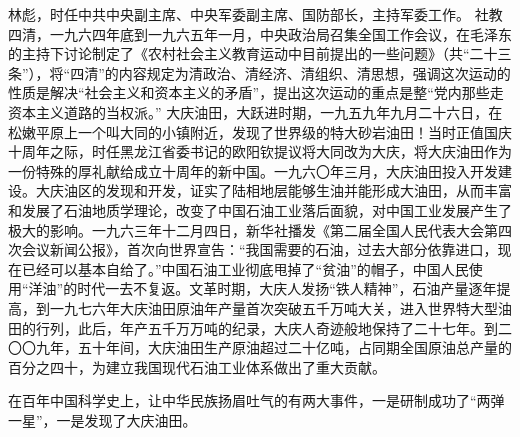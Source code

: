 \begin{maonote}
林彪，时任中共中央副主席、中央军委副主席、国防部长，主持军委工作。
社教四清，一九六四年底到一九六五年一月，中央政治局召集全国工作会议，在毛泽东的主持下讨论制定了《农村社会主义教育运动中目前提出的一些问题》（共“二十三条”），将“四清”的内容规定为清政治、清经济、清组织、清思想，强调这次运动的性质是解决“社会主义和资本主义的矛盾”，提出这次运动的重点是整“党内那些走资本主义道路的当权派。”
大庆油田，大跃进时期，一九五九年九月二十六日，在松嫩平原上一个叫大同的小镇附近，发现了世界级的特大砂岩油田！当时正值国庆十周年之际，时任黑龙江省委书记的欧阳钦提议将大同改为大庆，将大庆油田作为一份特殊的厚礼献给成立十周年的新中国。一九六〇年三月，大庆油田投入开发建设。大庆油区的发现和开发，证实了陆相地层能够生油并能形成大油田，从而丰富和发展了石油地质学理论，改变了中国石油工业落后面貌，对中国工业发展产生了极大的影响。一九六三年十二月四日，新华社播发《第二届全国人民代表大会第四次会议新闻公报》，首次向世界宣告：“我国需要的石油，过去大部分依靠进口，现在已经可以基本自给了。”中国石油工业彻底甩掉了“贫油”的帽子，中国人民使用“洋油”的时代一去不复返。文革时期，大庆人发扬“铁人精神”，石油产量逐年提高，到一九七六年大庆油田原油年产量首次突破五千万吨大关，进入世界特大型油田的行列，此后，年产五千万万吨的纪录，大庆人奇迹般地保持了二十七年。到二〇〇九年，五十年间，大庆油田生产原油超过二十亿吨，占同期全国原油总产量的百分之四十，为建立我国现代石油工业体系做出了重大贡献。

在百年中国科学史上，让中华民族扬眉吐气的有两大事件，一是研制成功了“两弹一星”，一是发现了大庆油田。
\end{maonote}
